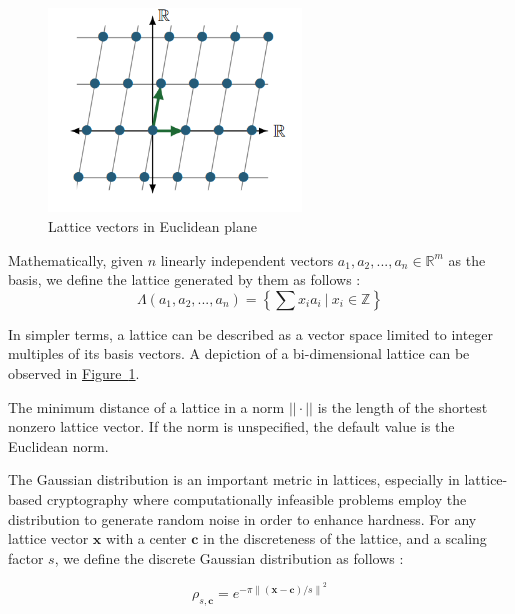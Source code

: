 \documentclass[11pt,
  titlepage=false,
  abstract=on,
]{scrreprt}
\begin{document}
\begin{figure}[h]
  \centering
  \includegraphics[width=0.6\textwidth]{figures/lattice-with-lattice-vectors.png}
  \caption{Lattice vectors in Euclidean plane \cite{latticesInPQC}}
  \label{fig:LatticeWithLatticeVectors}
\end{figure}


Mathematically, given $n$ linearly independent vectors $a_1, a_2,..., a_n \in \mathbb{R}^m$ as the basis, we define the lattice generated by them as follows \cite{latticesIntro2004}:
\begin{equation*}
  \Lambda(a_1, a_2,..., a_n) = \left\{\sum x_ia_i\ |\ x_i \in \mathbb{Z}\right\} 
\end{equation*}

In simpler terms, a lattice can be described as a vector space limited to integer multiples of its basis vectors.  A depiction of a bi-dimensional lattice can be observed in 
\hyperref[fig:LatticeWithLatticeVectors]{Figure~\ref{fig:LatticeWithLatticeVectors}}.

The minimum distance of a lattice in a norm $||\cdot||$ is the length of the shortest nonzero lattice vector. If the norm is unspecified, the default
value is the Euclidean norm.

The Gaussian distribution is an important metric in lattices, especially in lattice-based cryptography where computationally infeasible problems employ the distribution
to generate random noise in order to enhance hardness. For any lattice vector $\mathbf{x}$ with a center $\mathbf{c}$ in the discreteness of the lattice, and a scaling factor $s$,
we define the discrete Gaussian distribution as follows \cite{WCToAVGCase}:

\begin{equation*}
  \rho_{s,\mathbf{c}} = e^{-\pi {\| (\mathbf{x} - \mathbf{c}) / s\|}^2}
\end{equation*}
\end{document}
